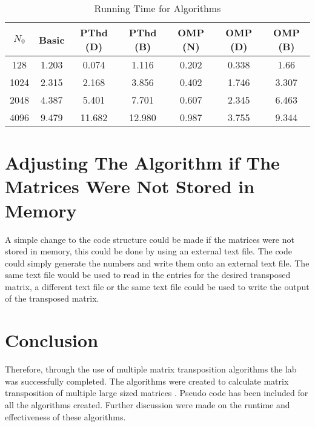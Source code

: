 \documentclass[twocolumn, 11pt]{IEEEtran}
\begin{document}
\begin{table}[H]
\caption{Running Time for Algorithms}
\label{table_example}
\begin{center}
\begin{tabular}{|c|c|c|c|c|c|c|}
\hline
$N_{0}$ & Basic & PThd (D) & PThd (B) & OMP (N) & OMP (D) & OMP (B) \\
\hline

\hline
 128 &1.203  &0.074 &1.116 &0.202 &0.338 &1.66 \\
\hline
  1024 &2.315  &2.168 &3.856 &0.402 &1.746 &3.307\\
\hline
 2048 & 4.387 &5.401 &7.701 &0.607 &2.345 &6.463 \\
\hline
 4096  & 9.479 &11.682 &12.980 & 0.987 &3.755 &9.344\\
\hline

\end{tabular}
\end{center}
\end{table}

\section{Adjusting The Algorithm if The Matrices Were Not Stored in Memory }

A simple change to the code structure could be made if the matrices were not stored in memory, this could be done by using an external text file. The code could simply generate the numbers and write them onto an external text file. The same text file would be used to read in the entries for the desired transposed matrix, a different text file or the same text file could be used to write the output of the transposed matrix.

\section{Conclusion}

Therefore, through the use of multiple matrix transposition algorithms the lab was successfully completed. The algorithms were created to calculate matrix transposition of multiple large sized matrices . Pseudo code has been included for all the algorithms created. Further discussion were made on the runtime and effectiveness of these algorithms.




\end{document}
